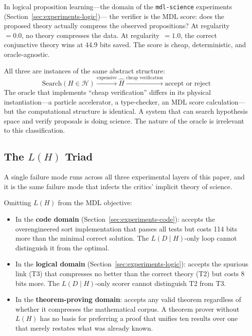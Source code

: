 In logical proposition learning---the domain of the
\texttt{mdl-science} experiments (Section~\ref{sec:experiments-logic})---
the verifier is the MDL score: does the proposed theory actually
compress the observed propositions? At regularity~$= 0.0$, no theory
compresses the data. At regularity~$= 1.0$, the correct conjunctive
theory wins at 44.9 bits saved. The score is cheap, deterministic,
and oracle-agnostic.

All three are instances of the same abstract structure:
\[
  \text{Search}(H \in \mathcal{H}) \xrightarrow{\text{expensive}}
  \hat{H} \xrightarrow{\text{cheap verification}} \text{accept or reject}
\]
The oracle that implements ``cheap verification'' differs in its
physical instantiation---a particle accelerator, a type-checker, an
MDL score calculation---but the computational structure is identical.
A system that can search hypothesis space and verify proposals is
doing science. The nature of the oracle is irrelevant to this
classification.

\subsection{The $L(H)$ Triad}

A single failure mode runs across all three experimental layers of
this paper, and it is the same failure mode that infects the critics'
implicit theory of science.

Omitting $L(H)$ from the MDL objective:
\begin{itemize}
  \item In the \textbf{code domain}
        (Section~\ref{sec:experiments-code}): accepts the overengineered
        sort implementation that passes all tests but costs 114 bits
        more than the minimal correct solution. The $L(D \mid H)$-only
        loop cannot distinguish it from the optimal.
  \item In the \textbf{logical domain}
        (Section~\ref{sec:experiments-logic}): accepts the spurious
        link (T3) that compresses no better than the correct theory (T2)
        but costs 8 bits more. The $L(D \mid H)$-only scorer cannot
        distinguish T2 from T3.
  \item In the \textbf{theorem-proving domain}: accepts any valid
        theorem regardless of whether it compresses the mathematical
        corpus. A theorem prover without $L(H)$ has no basis for
        preferring a proof that unifies ten results over one that
        merely restates what was already known.
\end{itemize}

